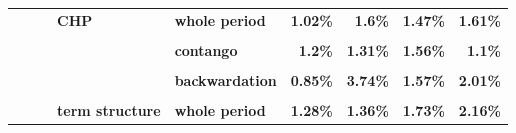 \documentclass[
  authoryear,
  preprint,
  3p]{elsarticle}
\begin{document}
\begin{landscape}
\begin{longtable}[t]{>{}l>{}l>{}l>{}l>{}l>{}r>{}r>{}r>{}r}
\textbf{} & \textbf{} & \textbf{} & \textbf{CHP} & \textbf{whole period} & \textcolor[HTML]{4285f4}{\textbf{1.02\%}} & \textcolor[HTML]{4285f4}{\textbf{1.6\%}} & \textcolor[HTML]{4285f4}{\textbf{1.47\%}} & \textcolor[HTML]{4285f4}{\textbf{1.61\%}}\\
\textbf{\cellcolor{gray!10}{}} & \textbf{\cellcolor{gray!10}{}} & \textbf{\cellcolor{gray!10}{}} & \textbf{\cellcolor{gray!10}{}} & \textbf{\cellcolor{gray!10}{backwardation}} & \textcolor[HTML]{4285f4}{\textbf{\cellcolor{gray!10}{1.14\%}}} & \textcolor[HTML]{4285f4}{\textbf{\cellcolor{gray!10}{2.47\%}}} & \textcolor[HTML]{4285f4}{\textbf{\cellcolor{gray!10}{1.72\%}}} & \textcolor[HTML]{4285f4}{\textbf{\cellcolor{gray!10}{3.11\%}}}\\
\textbf{} & \textbf{} & \textbf{} & \textbf{} & \textbf{contango} & \textcolor[HTML]{4285f4}{\textbf{1.2\%}} & \textcolor[HTML]{4285f4}{\textbf{1.31\%}} & \textcolor[HTML]{4285f4}{\textbf{1.56\%}} & \textcolor[HTML]{4285f4}{\textbf{1.1\%}}\\
\addlinespace
\textbf{\cellcolor{gray!10}{}} & \textbf{\cellcolor{gray!10}{}} & \textbf{\cellcolor{gray!10}{}} & \textbf{\cellcolor{gray!10}{open interest}} & \textbf{\cellcolor{gray!10}{whole period}} & \textcolor[HTML]{4285f4}{\textbf{\cellcolor{gray!10}{1.09\%}}} & \textcolor[HTML]{4285f4}{\textbf{\cellcolor{gray!10}{1.9\%}}} & \textcolor[HTML]{4285f4}{\textbf{\cellcolor{gray!10}{0.45\%}}} & \textcolor[HTML]{4285f4}{\textbf{\cellcolor{gray!10}{1\%}}}\\
\textbf{} & \textbf{} & \textbf{} & \textbf{} & \textbf{backwardation} & \textcolor[HTML]{4285f4}{\textbf{0.85\%}} & \textcolor[HTML]{4285f4}{\textbf{3.74\%}} & \textcolor[HTML]{4285f4}{\textbf{1.57\%}} & \textcolor[HTML]{4285f4}{\textbf{2.01\%}}\\
\textbf{\cellcolor{gray!10}{}} & \textbf{\cellcolor{gray!10}{}} & \textbf{\cellcolor{gray!10}{}} & \textbf{\cellcolor{gray!10}{}} & \textbf{\cellcolor{gray!10}{contango}} & \textcolor[HTML]{4285f4}{\textbf{\cellcolor{gray!10}{1.58\%}}} & \textcolor[HTML]{4285f4}{\textbf{\cellcolor{gray!10}{0.97\%}}} & \textcolor[HTML]{4285f4}{\textbf{\cellcolor{gray!10}{0.58\%}}} & \textcolor[HTML]{4285f4}{\textbf{\cellcolor{gray!10}{0.67\%}}}\\
\textbf{} & \textbf{} & \textbf{} & \textbf{term structure} & \textbf{whole period} & \textcolor[HTML]{4285f4}{\textbf{1.28\%}} & \textcolor[HTML]{4285f4}{\textbf{1.36\%}} & \textcolor[HTML]{4285f4}{\textbf{1.73\%}} & \textcolor[HTML]{4285f4}{\textbf{2.16\%}}\\

\end{longtable}
\end{landscape}
\end{document}
